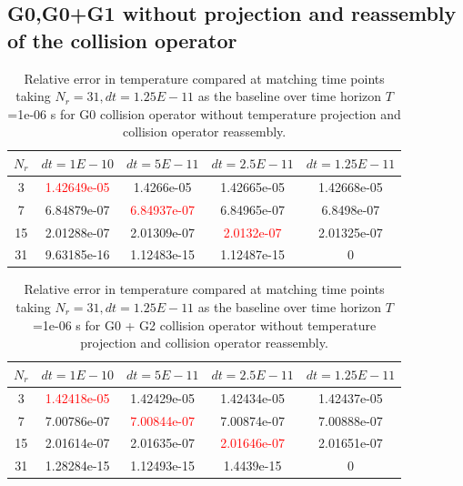 \documentclass{article}
\begin{document}
\subsection{G0,G0+G1 without projection and reassembly of the collision operator}

\begin{table}[H]
	\centering
	\begin{tabular}{|c|c|c|c|c|}
		\hline
		$N_r$ & $dt=1E-10$ & $dt=5E-11$ & $dt=2.5E-11$ & $dt=1.25E-11$\\
		\hline
		3    & \textcolor{red}{1.42649e-05} & 1.4266e-05   &  1.42665e-05   & 1.42668e-05 \\
		7    & 6.84879e-07  & \textcolor{red}{6.84937e-07}  &  6.84965e-07   & 6.8498e-07 \\
		15   & 2.01288e-07  & 2.01309e-07  &  \textcolor{red}{2.0132e-07}    & 2.01325e-07 \\
		31   & 9.63185e-16  & 1.12483e-15  &  1.12487e-15   & 0 \\
		\hline
	\end{tabular}
	\caption{Relative error in temperature compared at matching time points taking $N_r=31,dt=1.25E-11$ as the baseline over time horizon $T$=1e-06 s for G0 collision operator without temperature projection and collision operator reassembly. }
\end{table}

\begin{table}[H]
	\centering
	\begin{tabular}{|c|c|c|c|c|}
		\hline
		$N_r$ & $dt=1E-10$ & $dt=5E-11$ & $dt=2.5E-11$ & $dt=1.25E-11$\\
		\hline
            3   & \textcolor{red}{1.42418e-05}  & 1.42429e-05  &  1.42434e-05  &  1.42437e-05\\
            7   & 7.00786e-07  & \textcolor{red}{7.00844e-07}  &  7.00874e-07  &  7.00888e-07\\
            15  & 2.01614e-07  & 2.01635e-07  &  \textcolor{red}{2.01646e-07}  &  2.01651e-07\\
            31  & 1.28284e-15  & 1.12493e-15  &  1.4439e-15   &  0\\
		\hline
	\end{tabular}
	\caption{Relative error in temperature compared at matching time points taking $N_r=31,dt=1.25E-11$ as the baseline over time horizon $T$=1e-06 s for G0 + G2 collision operator without temperature projection and collision operator reassembly. }
\end{table}
\end{document}
